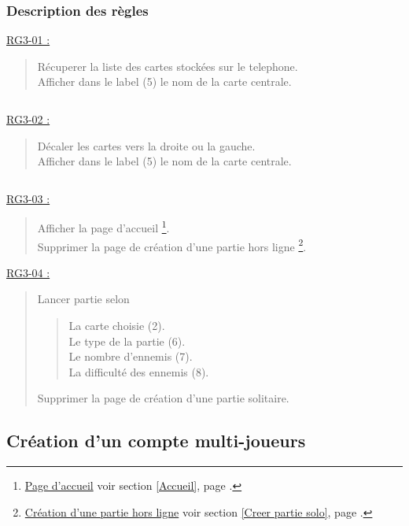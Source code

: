 \documentclass{report}
\begin{document}
\newpage
			
		\subsubsection{Description des règles}

			\underline{RG3-01 :}
				\begin{quote}
					Récuperer la liste des cartes stockées sur le telephone.\\
					Afficher dans le label (5) le nom de la carte centrale.
				\end{quote}
			
			$\,$
				
			\underline{RG3-02 :}
				\begin{quote}
					Décaler les cartes vers la droite ou la gauche.\\
					Afficher dans le label (5) le nom de la carte centrale.
				\end{quote}

			$\,$

			\underline{RG3-03 :}
				\begin{quote}
					Afficher la page d'accueil%
						\footnote[1]{
							\hyperlink{Page d'accueil}{Page d'accueil}
							\og voir section \ref{Accueil}, page \pageref{Accueil}.\fg
						}.\\
					Supprimer la page de création d'une partie hors ligne
					\footnote[2]{
						\hyperlink{Creer partie solo}{Création d'une partie hors ligne}
						\og voir section \ref{Creer partie solo}, page \pageref{Creer partie solo}.\fg
					}.\\
				\end{quote}


			\underline{RG3-04 :}
				\begin{quote}
					 Lancer partie selon
					 \begin{quote}
					 	La carte choisie (2).\\
					 	Le type de la partie (6).\\
					 	Le nombre d'ennemis (7).\\
					 	La difficulté des ennemis (8).
					 \end{quote}
					 Supprimer la page de création d'une partie solitaire.\\
				\end{quote}	


\newpage

	\subsection{Création d'un compte multi-joueurs}
	
\end{document}
